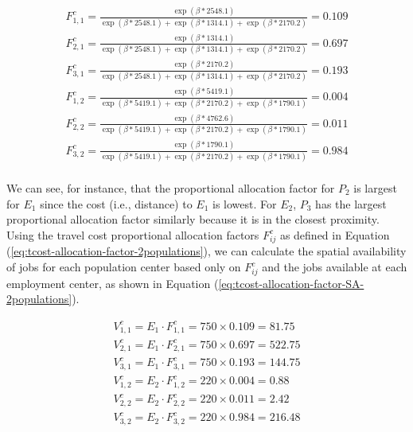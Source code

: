 \documentclass[]{elsarticle} %
\begin{document}
\begin{equation}
\label{eq:tcost-allocation-factor-2populations}
\begin{array}{l}
F^c_{1,1} = \frac{\exp(\beta*2548.1)}{\exp(\beta *2548.1) + \exp(\beta *1314.1) + \exp(\beta *2170.2)} = 0.109\\
F^c_{2,1} = \frac{\exp(\beta *1314.1)}{\exp(\beta *2548.1) + \exp(\beta *1314.1) + \exp(\beta *2170.2)} = 0.697\\
F^c_{3,1} = \frac{\exp(\beta *2170.2)}{\exp(\beta *2548.1) + \exp(\beta *1314.1) + \exp(\beta *2170.2)} = 0.193\\
F^c_{1,2} = \frac{\exp(\beta*5419.1)}{\exp(\beta *5419.1) + \exp(\beta *2170.2) + \exp(\beta *1790.1)} = 0.004\\
F^c_{2,2} = \frac{\exp(\beta *4762.6)}{\exp(\beta *5419.1) + \exp(\beta *2170.2) + \exp(\beta *1790.1)} = 0.011\\
F^c_{3,2} = \frac{\exp(\beta *1790.1)}{\exp(\beta *5419.1) + \exp(\beta *2170.2) + \exp(\beta *1790.1)} = 0.984\\
\end{array}
\end{equation}

We can see, for instance, that the proportional allocation factor for
\(P_2\) is largest for \(E_1\) since the cost (i.e., distance) to
\(E_1\) is lowest. For \(E_2\), \(P_3\) has the largest proportional
allocation factor similarly because it is in the closest proximity.
Using the travel cost proportional allocation factors \(F^c_{ij}\) as
defined in Equation (\ref{eq:tcost-allocation-factor-2populations}), we
can calculate the spatial availability of jobs for each population
center based only on \(F^c_{ij}\) and the jobs available at each
employment center, as shown in Equation
(\ref{eq:tcost-allocation-factor-SA-2populations}).

\begin{equation}
\label{eq:tcost-allocation-factor-SA-2populations}
\begin{array}{l}
V^c_{1,1} = E_1 \cdot F^c_{1,1} = 750 \times 0.109 = 81.75\\
V^c_{2,1} = E_1 \cdot F^c_{2,1} = 750 \times  0.697 = 522.75\\
V^c_{3,1} = E_1 \cdot F^c_{3,1} = 750 \times  0.193 = 144.75\\
V^c_{1,2} = E_2 \cdot F^c_{1,2} = 220 \times 0.004 = 0.88\\
V^c_{2,2} = E_2 \cdot F^c_{2,2} = 220 \times  0.011 = 2.42\\
V^c_{3,2} = E_2 \cdot F^c_{3,2} = 220 \times  0.984 = 216.48\\
\end{array}
\end{equation}
\end{document}
